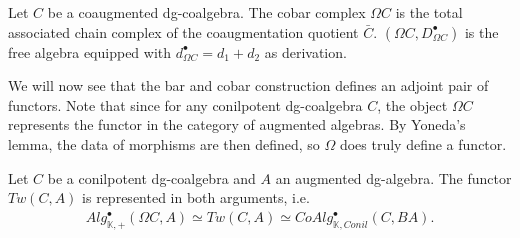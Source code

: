 \documentclass[../thesis.tex]{subfiles}
\begin{document}
            \begin{proposition}
                Let $C$ be a coaugmented dg-coalgebra. The cobar complex $\Omega C$ is the total associated chain complex of the coaugmentation quotient $\bar{C}$. $(\Omega C, D_{\Omega C}^\bullet)$ is the free algebra equipped with $d_{\Omega C}^\bullet = d_1 + d_2$ as derivation.
            \end{proposition}

            \begin{center}
            \end{center}

            We will now see that the bar and cobar construction defines an adjoint pair of functors. Note that since for any conilpotent dg-coalgebra $C$, the object $\Omega C$ represents the functor in the category of augmented algebras. By Yoneda's lemma, the data of morphisms are then defined, so $\Omega$ does truly define a functor.

            \begin{thm}\label{thm: cobar-bar-adj}
                Let $C$ be a conilpotent dg-coalgebra and $A$ an augmented dg-algebra. The functor $Tw(C,A)$ is represented in both arguments, i.e.
                \begin{align*}
                    Alg_{\mathbb{K},+}^\bullet(\Omega C, A)\simeq Tw(C, A) \simeq CoAlg_{\mathbb{K},Conil}^\bullet(C, BA)\text{.}
                \end{align*}
            \end{thm}
\end{document}
